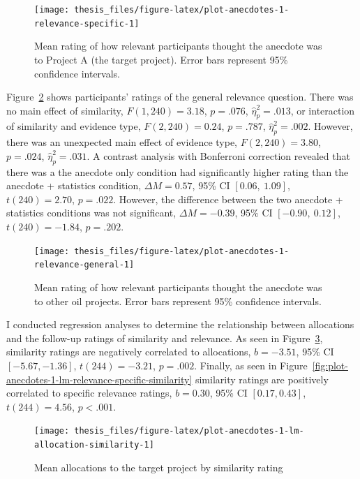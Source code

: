 \documentclass[a4paper, nobind, dvipsnames]{templates/ociamthesis}
\theoremstyle{definition}
\theoremstyle{definition}
\theoremstyle{definition}
\theoremstyle{definition}
\theoremstyle{remark}
\begin{document}
\begin{figure}
\texttt{[image: thesis\_files/figure-latex/plot-anecdotes-1-relevance-specific-1]} \caption{Mean rating of how relevant participants thought the anecdote was to Project A (the target project). Error bars represent 95\% confidence intervals.}\label{fig:plot-anecdotes-1-relevance-specific}
\end{figure}

Figure~\ref{fig:plot-anecdotes-1-relevance-general} shows participants' ratings
of the general relevance question. There was no main effect of similarity,
\(F(1, 240) = 3.18\), \(p = .076\), \(\hat{\eta}^2_p = .013\), or interaction of
similarity and evidence type,
\(F(2, 240) = 0.24\), \(p = .787\), \(\hat{\eta}^2_p = .002\). However, there was
an unexpected main effect of evidence type,
\(F(2, 240) = 3.80\), \(p = .024\), \(\hat{\eta}^2_p = .031\). A contrast analysis with
Bonferroni correction revealed that there was a the anecdote only condition had
significantly higher rating than the anecdote + statistics condition,
\(\Delta M = 0.57\), 95\% CI \([0.06,~1.09]\), \(t(240) = 2.70\), \(p = .022\). However, the
difference between the two anecdote + statistics conditions was not significant,
\(\Delta M = -0.39\), 95\% CI \([-0.90,~0.12]\), \(t(240) = -1.84\), \(p = .202\).



\begin{figure}
\texttt{[image: thesis\_files/figure-latex/plot-anecdotes-1-relevance-general-1]} \caption{Mean rating of how relevant participants thought the anecdote was to other oil projects. Error bars represent 95\% confidence intervals.}\label{fig:plot-anecdotes-1-relevance-general}
\end{figure}

I conducted regression analyses to determine the relationship between
allocations and the follow-up ratings of similarity and relevance. As seen in
Figure~\ref{fig:plot-anecdotes-1-lm-allocation-similarity}, similarity ratings
are negatively correlated to allocations,
\(b = -3.51\), 95\% CI \([-5.67, -1.36]\), \(t(244) = -3.21\), \(p = .002\). Finally, as seen in
Figure~\ref{fig:plot-anecdotes-1-lm-relevance-specific-similarity} similarity
ratings are positively correlated to specific relevance ratings,
\(b = 0.30\), 95\% CI \([0.17, 0.43]\), \(t(244) = 4.56\), \(p < .001\).



\begin{figure}
\texttt{[image: thesis\_files/figure-latex/plot-anecdotes-1-lm-allocation-similarity-1]} \caption{Mean allocations to the target project by similarity rating}\label{fig:plot-anecdotes-1-lm-allocation-similarity}
\end{figure}
\end{document}
